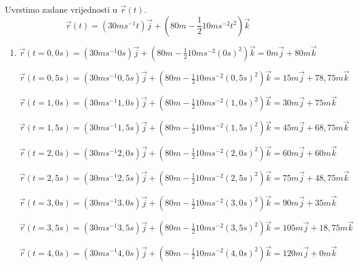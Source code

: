 
Uvrstimo zadane vrijednosti u $\vec{r}(t)$.
$$
\vec{r}(t)=(30ms^{-1}t) \vec{j} +(80m-\frac{1}{2}10ms^{-2}t^2 )\vec{k}
$$

\begin{enumerate}[label=\alph*)]
  \item $ \vec{r}(t=0,0s)=(30ms^{-1}0s) \vec{j} +(80m-\frac{1}{2}10ms^{-2}(0s)^2 )\vec{k}= 0m\vec{j}+80m\vec{k}$
  
  $ \vec{r}(t=0,5s)=(30ms^{-1}0,5s) \vec{j} +(80m-\frac{1}{2}10ms^{-2}(0,5s)^2 )\vec{k}= 15m\vec{j}+78,75m\vec{k}$
  
  $ \vec{r}(t=1,0s)=(30ms^{-1}1,0s) \vec{j} +(80m-\frac{1}{2}10ms^{-2}(1,0s)^2 )\vec{k}= 30m\vec{j}+75m\vec{k}$
  
  $ \vec{r}(t=1,5s)=(30ms^{-1}1,5s) \vec{j} +(80m-\frac{1}{2}10ms^{-2}(1,5s)^2 )\vec{k}= 45m\vec{j}+68,75m\vec{k}$
  
  $ \vec{r}(t=2,0s)=(30ms^{-1}2,0s) \vec{j} +(80m-\frac{1}{2}10ms^{-2}(2,0s)^2 )\vec{k}= 60m\vec{j}+60m\vec{k}$
  
  $ \vec{r}(t=2,5s)=(30ms^{-1}2,5s) \vec{j} +(80m-\frac{1}{2}10ms^{-2}(2,5s)^2 )\vec{k}= 75m\vec{j}+48,75m\vec{k}$
   
  $ \vec{r}(t=3,0s)=(30ms^{-1}3,0s) \vec{j} +(80m-\frac{1}{2}10ms^{-2}(3,0s)^2 )\vec{k}= 90m\vec{j}+35m\vec{k}$
  
  $ \vec{r}(t=3,5s)=(30ms^{-1}3,5s) \vec{j} +(80m-\frac{1}{2}10ms^{-2}(3,5s)^2 )\vec{k}= 105m\vec{j}+18,75m\vec{k}$

  $ \vec{r}(t=4,0s)=(30ms^{-1}4,0s) \vec{j} +(80m-\frac{1}{2}10ms^{-2}(4,0s)^2 )\vec{k}= 120m\vec{j}+0m\vec{k}$


\end{enumerate}
